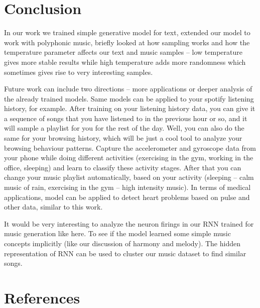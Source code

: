 \documentclass{article}
\begin{document}
\section{Conclusion}
In our work we trained simple generative model for text, extended our model to work with polyphonic music, briefly looked at how sampling works and how the temperature parameter affects our text and music samples – low temperature gives more stable results while high temperature adds more randomness which sometimes gives rise to very interesting samples.

Future work can include two directions – more applications or deeper analysis of the already trained models. Same models can be applied to your spotify listening history, for example. After training on your listening history data, you can give it a sequence of songs that you have listened to in the previous hour or so, and it will sample a playlist for you for the rest of the day. Well, you can also do the same for your browsing history, which will be just a cool tool to analyze your browsing behaviour patterns. Capture the accelerometer and gyroscope data from your phone while doing different activities (exercising in the gym, working in the office, sleeping) and learn to classify these activity stages. After that you can change your music playlist automatically, based on your activity (sleeping – calm music of rain, exercising in the gym – high intensity music). In terms of medical applications, model can be applied to detect heart problems based on pulse and other data, similar to this work.

It would be very interesting to analyze the neuron firings in our RNN trained for music generation like here. To see if the model learned some simple music concepts implicitly (like our discussion of harmony and melody). The hidden representation of RNN can be used to cluster our music dataset to find similar songs.
\section{References}


\end{document}
